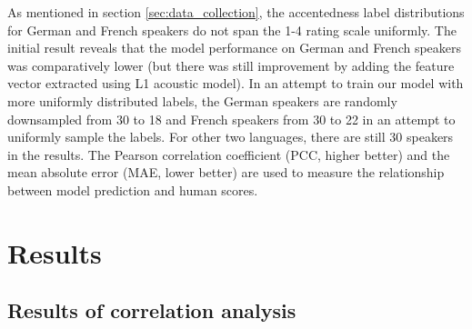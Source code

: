 As mentioned in section \ref{sec:data_collection}, the accentedness label distributions for German and French speakers do not span the 1-4 rating scale uniformly. The initial result reveals that the model performance on German and French speakers was comparatively lower (but there was still improvement by adding the feature vector extracted using L1 acoustic model). In an attempt to train our model with more uniformly distributed labels, the German speakers are randomly downsampled from 30 to 18 and French speakers from 30 to 22 in an attempt to uniformly sample the labels. For other two languages, there are still 30 speakers in the results. The Pearson correlation coefficient (PCC, higher better) and the mean absolute error (MAE, lower better) are used to measure the relationship between model prediction and human scores.

\section{Results}

\subsection{Results of correlation analysis}

